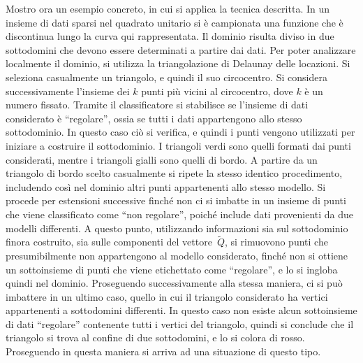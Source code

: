 Mostro ora un esempio concreto, in cui si applica la tecnica descritta.  In un insieme di dati sparsi nel quadrato unitario  si è campionata una funzione che è discontinua lungo la curva qui rappresentata.  Il dominio risulta diviso in due sottodomini che devono essere determinati a partire dai dati.
Per poter analizzare localmente il dominio, si utilizza la triangolazione di Delaunay delle locazioni.  Si seleziona casualmente un triangolo, e quindi il suo circocentro.   Si considera successivamente l’insieme dei $k$ punti più vicini al circocentro, dove $k$ è un numero  fissato.  Tramite il classificatore si stabilisce se l’insieme di dati considerato è “regolare”, ossia se tutti i dati appartengono allo stesso sottodominio.   In questo caso ciò si verifica, e quindi i punti vengono utilizzati per iniziare a costruire il sottodominio.  I triangoli verdi sono quelli formati dai punti considerati, mentre i triangoli gialli sono quelli di bordo.  A partire da un triangolo di bordo scelto casualmente si ripete la stesso identico procedimento, includendo così nel dominio altri punti appartenenti allo stesso modello.  Si procede per estensioni successive finché non ci si imbatte in un insieme di punti che viene classificato come “non regolare”, poiché include dati provenienti da due modelli differenti.  A questo punto, utilizzando informazioni sia sul sottodominio finora costruito, sia sulle componenti del vettore~$\tilde Q$, si rimuovono punti che presumibilmente non appartengono al modello considerato, finché non si ottiene un sottoinsieme di punti che viene etichettato come “regolare”, e lo si ingloba quindi nel dominio.  Proseguendo successivamente alla stessa maniera, ci si può imbattere in un ultimo caso, quello in cui il triangolo considerato ha vertici appartenenti  a sottodomini differenti.  In questo caso non esiste alcun sottoinsieme di dati “regolare” contenente tutti i vertici del triangolo, quindi si conclude che il triangolo si trova al confine di due sottodomini, e lo si colora di rosso.   
Proseguendo in questa maniera si arriva ad una situazione di questo tipo.

